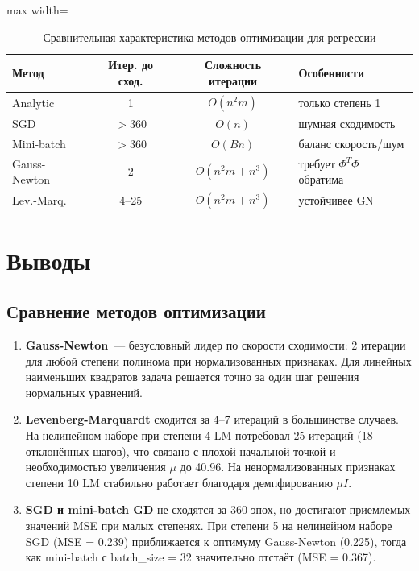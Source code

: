 \documentclass[12pt]{article}
\begin{document}
\begin{table}[H]
\centering
\caption{Сравнительная характеристика методов оптимизации для регрессии}
\begin{adjustbox}{max width=\textwidth}
\begin{tabular}{lccl}
\toprule
\textbf{Метод} & \textbf{Итер. до сход.} & \textbf{Сложность итерации} & \textbf{Особенности} \\
\midrule
Analytic & 1 & $O(n^2 m)$ & только степень 1 \\
SGD & $>$360 & $O(n)$ & шумная сходимость \\
Mini-batch & $>$360 & $O(Bn)$ & баланс скорость/шум \\
Gauss-Newton & 2 & $O(n^2 m + n^3)$ & требует $\Phi^T\Phi$ обратима \\
Lev.-Marq. & 4--25 & $O(n^2 m + n^3)$ & устойчивее GN \\
\bottomrule
\end{tabular}
\end{adjustbox}
\end{table}

\section{Выводы}

\subsection*{Сравнение методов оптимизации}

\begin{enumerate}
    \item \textbf{Gauss-Newton}~--- безусловный лидер по скорости сходимости: 2 итерации для любой степени полинома при нормализованных признаках. Для линейных наименьших квадратов задача решается точно за один шаг решения нормальных уравнений.

    \item \textbf{Levenberg-Marquardt} сходится за 4--7 итераций в большинстве случаев. На нелинейном наборе при степени 4 LM потребовал 25 итераций (18 отклонённых шагов), что связано с плохой начальной точкой и необходимостью увеличения $\mu$ до 40.96. На ненормализованных признаках степени 10 LM стабильно работает благодаря демпфированию $\mu I$.

    \item \textbf{SGD и mini-batch GD} не сходятся за 360 эпох, но достигают приемлемых значений MSE при малых степенях. При степени 5 на нелинейном наборе SGD (MSE = 0.239) приближается к оптимуму Gauss-Newton (0.225), тогда как mini-batch с batch\_size = 32 значительно отстаёт (MSE = 0.367).
\end{enumerate}
\end{document}
